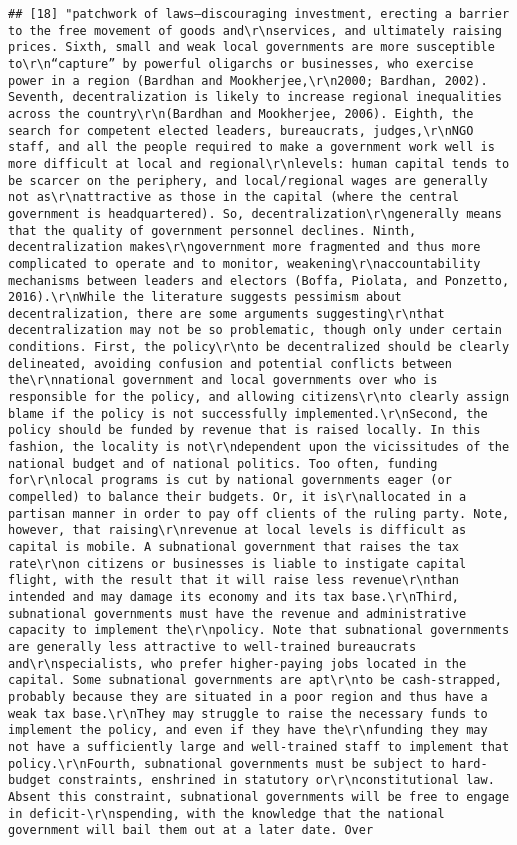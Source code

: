 \documentclass[
]{article}
\begin{document}
\begin{verbatim}
## [18] "patchwork of laws—discouraging investment, erecting a barrier to the free movement of goods and\r\nservices, and ultimately raising prices. Sixth, small and weak local governments are more susceptible to\r\n“capture” by powerful oligarchs or businesses, who exercise power in a region (Bardhan and Mookherjee,\r\n2000; Bardhan, 2002). Seventh, decentralization is likely to increase regional inequalities across the country\r\n(Bardhan and Mookherjee, 2006). Eighth, the search for competent elected leaders, bureaucrats, judges,\r\nNGO staff, and all the people required to make a government work well is more difficult at local and regional\r\nlevels: human capital tends to be scarcer on the periphery, and local/regional wages are generally not as\r\nattractive as those in the capital (where the central government is headquartered). So, decentralization\r\ngenerally means that the quality of government personnel declines. Ninth, decentralization makes\r\ngovernment more fragmented and thus more complicated to operate and to monitor, weakening\r\naccountability mechanisms between leaders and electors (Boffa, Piolata, and Ponzetto, 2016).\r\nWhile the literature suggests pessimism about decentralization, there are some arguments suggesting\r\nthat decentralization may not be so problematic, though only under certain conditions. First, the policy\r\nto be decentralized should be clearly delineated, avoiding confusion and potential conflicts between the\r\nnational government and local governments over who is responsible for the policy, and allowing citizens\r\nto clearly assign blame if the policy is not successfully implemented.\r\nSecond, the policy should be funded by revenue that is raised locally. In this fashion, the locality is not\r\ndependent upon the vicissitudes of the national budget and of national politics. Too often, funding for\r\nlocal programs is cut by national governments eager (or compelled) to balance their budgets. Or, it is\r\nallocated in a partisan manner in order to pay off clients of the ruling party. Note, however, that raising\r\nrevenue at local levels is difficult as capital is mobile. A subnational government that raises the tax rate\r\non citizens or businesses is liable to instigate capital flight, with the result that it will raise less revenue\r\nthan intended and may damage its economy and its tax base.\r\nThird, subnational governments must have the revenue and administrative capacity to implement the\r\npolicy. Note that subnational governments are generally less attractive to well-trained bureaucrats and\r\nspecialists, who prefer higher-paying jobs located in the capital. Some subnational governments are apt\r\nto be cash-strapped, probably because they are situated in a poor region and thus have a weak tax base.\r\nThey may struggle to raise the necessary funds to implement the policy, and even if they have the\r\nfunding they may not have a sufficiently large and well-trained staff to implement that policy.\r\nFourth, subnational governments must be subject to hard-budget constraints, enshrined in statutory or\r\nconstitutional law. Absent this constraint, subnational governments will be free to engage in deficit-\r\nspending, with the knowledge that the national government will bail them out at a later date. Over 
\end{verbatim}
\end{document}
